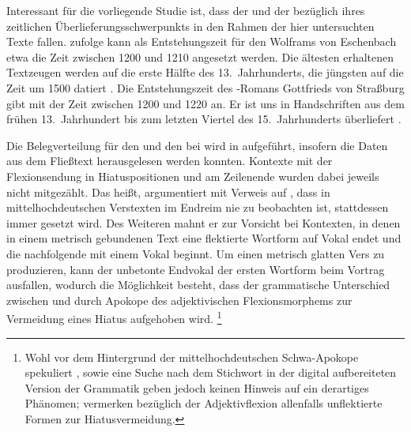 Interessant für die vorliegende Studie ist, dass der  und der
 bezüglich ihres zeitlichen Überlieferungsschwerpunkts in den
Rahmen der hier untersuchten Texte fallen. \citet[1378]{bumke1999} zufolge kann
als Entstehungszeit für den  Wolframs von Eschenbach etwa die
Zeit zwischen 1200 und 1210 angesetzt werden. Die ältesten erhaltenen
Textzeugen werden auf die erste Hälfte des 13.~Jahrhunderts, die jüngsten auf
die Zeit um 1500 datiert
\autocites[1381]{bumke1999}[vgl.~auch][s.\,v.~\textit{Wolfram von Eschenbach:
}]{hsc}. Die Entstehungszeit des -Romans Gottfrieds
von Straßburg gibt \citet[155]{kuhn1982} mit der
Zeit zwischen 1200 und 1220 an. Er ist uns in Handschriften aus dem frühen
13.~Jahrhundert bis zum letzten Viertel des 15.~Jahrhunderts überliefert
\autocite[vgl.][s.\,v.~\textit{Gottfried von Straßburg: }]{hsc}.

Die Belegverteilung für den  und den  bei
\citet{askedal1973} wird in  aufgeführt, insofern die
Daten aus dem Fließtext herausgelesen werden konnten. Kontexte mit der
Flexionsendung in Hiatuspositionen und am Zeilenende wurden dabei jeweils nicht
mitgezählt. Das heißt, \citet[89--91]{askedal1973} argumentiert mit Verweis auf
\citet[662--663]{grimm1870}, dass in mittelhochdeutschen
Verstexten im Endreim nie  zu beobachten ist, stattdessen immer
 gesetzt wird. Des Weiteren mahnt er zur Vorsicht bei Kontexten, in
denen in einem metrisch gebundenen Text eine flektierte Wortform auf Vokal
endet und die nachfolgende mit einem Vokal beginnt. Um einen metrisch glatten
Vers zu produzieren, kann der unbetonte Endvokal der ersten Wortform beim
Vortrag ausfallen, wodurch die Möglichkeit besteht, dass der grammatische
Unterschied zwischen  und
 durch Apokope des adjektivischen Flexionsmorphems zur Vermeidung
eines Hiatus aufgehoben wird.%
%
	\footnote{Wohl vor dem Hintergrund der
		mittelhochdeutschen Schwa-Apokope
		\autocites{lindgren1953}[109--111]{paul2007} spekuliert
		\citet[91]{askedal1973},  \citet[27, 109--111,
		203]{paul2007} sowie eine Suche nach dem Stichwort  in der
		digital aufbereiteten Version der Grammatik geben jedoch keinen Hinweis
		auf ein derartiges Phänomen; \citet[244]{ksw2} vermerken bezüglich der
		Adjektivflexion allenfalls unflektierte Formen zur Hiatusvermeidung.
		}
		
